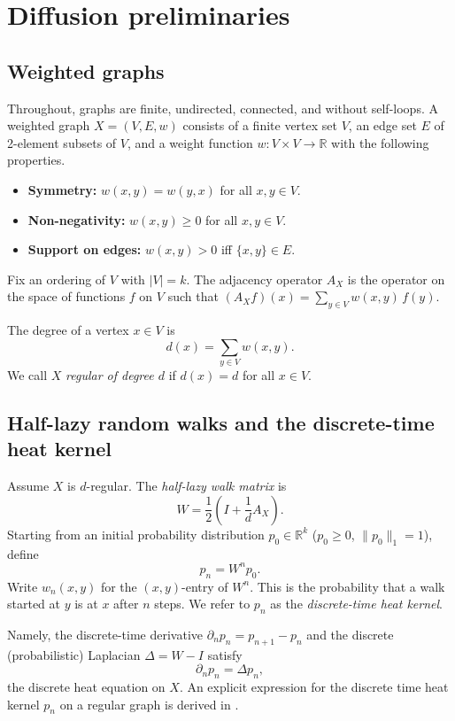 \documentclass[11pt,reqno]{article}
\numberwithin{equation}{section}
\theoremstyle{plain}
\theoremstyle{definition}
\theoremstyle{remark}
\newcommand{\R}{\mathbb{R}}
\begin{document}
\section{Diffusion preliminaries}
\label{sec:prelim}

\subsection{Weighted graphs}

Throughout, graphs are finite, undirected, connected, and without self-loops.
A weighted graph $X=(V,E,w)$ consists of a finite vertex set $V$, an edge set $E$ of 2-element subsets of $V$,
and a weight function $w\colon V\times V\to\R$ with the following properties.
\begin{itemize}[leftmargin=2em]
\item \textbf{Symmetry:} $w(x,y)=w(y,x)$ for all $x,y\in V$.
\item \textbf{Non-negativity:} $w(x,y)\ge 0$ for all $x,y\in V$.
\item \textbf{Support on edges:} $w(x,y)>0$ iff $\{x,y\}\in E$.
\end{itemize}
Fix an ordering of $V$ with $|V|=k$. The adjacency operator $A_X$ is the operator on the space of functions
$f$ on $V$ such that $(A_X f)(x)=\sum_{y\in V} w(x,y)\,f(y).$

The degree of a vertex $x \in V$ is
\[
d(x)=\sum_{y\in V} w(x,y).
\]
We call $X$ \emph{regular of degree $d$} if $d(x)=d$ for all $x\in V$.

\subsection{Half-lazy random walks and the discrete-time heat kernel}
\label{subsec:random-walks}

Assume $X$ is $d$-regular. The \emph{half-lazy walk matrix} is
\begin{equation}\label{eq:W}
W = \frac12\left(I+\frac{1}{d}A_X\right).
\end{equation}
Starting from an initial probability distribution $p_0\in\R^k$ ($p_0\ge 0$, $\|p_0\|_1=1$),
define
\[
p_n = W^n p_0.
\]
Write $w_n(x,y)$ for the $(x,y)$-entry of $W^n$. This is the probability that a walk started at $y$ is at $x$ after $n$ steps.
We refer to $p_n$ as the \emph{discrete-time heat kernel}.

Namely, the discrete-time derivative $\partial_n p_n = p_{n+1}-p_n$ and the discrete (probabilistic) Laplacian $\Delta = W-I$ satisfy
\begin{equation}\label{eq:discrete-heat}
\partial_n p_n = \Delta p_n,
\end{equation}
the discrete heat equation on $X$. An explicit expression for the discrete time heat kernel $p_n$ on a regular graph is derived in \cite{CHJSV23}.
\end{document}
